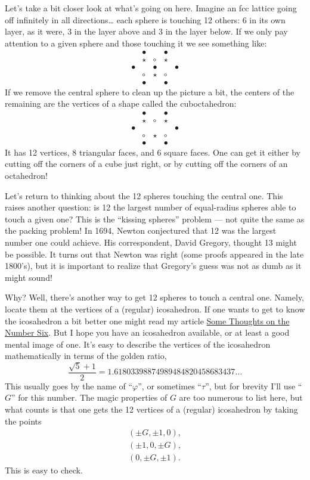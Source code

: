 \documentclass{article}
\begin{document}
Let's take a bit closer look at what's going on here. Imagine an fcc
lattice going off infinitely in all directions\ldots{} each sphere is
touching 12 others: 6 in its own layer, as it were, 3 in the layer above
and 3 in the layer below. If we only pay attention to a given sphere and
those touching it we see something like: \[
  \begin{array}{ccccc}
    &\bullet&&\bullet&
  \\&\star&\circ&\star&
  \\\bullet&&\bullet&&\bullet
  \\&\circ&\star&\circ
  \\&\bullet&&\bullet&
  \end{array}
\] If we remove the central sphere to clean up the picture a bit, the
centers of the remaining are the vertices of a shape called the
cuboctahedron: \[
  \begin{array}{ccccc}
    &\bullet&&\bullet&
  \\&\star&\circ&\star&
  \\\bullet&&&&\bullet
  \\&\circ&\star&\circ
  \\&\bullet&&\bullet&
  \end{array}
\] It has 12 vertices, 8 triangular faces, and 6 square faces. One can
get it either by cutting off the corners of a cube just right, or by
cutting off the corners of an octahedron!

Let's return to thinking about the 12 spheres touching the central one.
This raises another question: is 12 the largest number of equal-radius
spheres able to touch a given one? This is the ``kissing spheres''
problem --- not quite the same as the packing problem! In 1694, Newton
conjectured that 12 was the largest number one could achieve. His
correspondent, David Gregory, thought 13 might be possible. It turns out
that Newton was right (some proofs appeared in the late 1800's), but it
is important to realize that Gregory's guess was not as dumb as it might
sound!

Why? Well, there's another way to get 12 spheres to touch a central one.
Namely, locate them at the vertices of a (regular) icosahedron. If one
wants to get to know the icosahedron a bit better one might read my
article \href{http://math.ucr.edu/home/baez/six.html}{Some Thoughts on
the Number Six}. But I hope you have an icosahedron available, or at
least a good mental image of one. It's easy to describe the vertices of
the icosahedron mathematically in terms of the golden ratio,
\[\frac{\sqrt{5} + 1}{2} = 1.61803398874989484820458683437\ldots\] This
usually goes by the name of ``\(\varphi\)'', or sometimes ``\(\tau\)'',
but for brevity I'll use ``\(G\)'' for this number. The magic properties
of \(G\) are too numerous to list here, but what counts is that one gets
the 12 vertices of a (regular) icosahedron by taking the points \[
  \begin{gathered}
    (\pm G, \pm1, 0),
  \\(\pm1, 0, \pm G),
  \\(0, \pm G, \pm1).
  \end{gathered}
\] This is easy to check.
\end{document}
